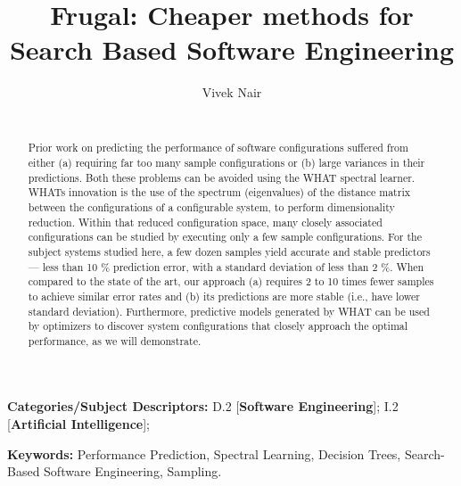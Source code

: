 \documentclass{newsig}
\begin{document}
\title{Frugal: Cheaper methods for Search Based Software Engineering} 
\author{
        \alignauthor Vivek Nair \\
        \\
               }
\maketitle 
\thispagestyle{plain}
\pagestyle{plain}
\begin{abstract}
Prior work on predicting the performance of software configurations
suffered from either (a) requiring far too many sample configurations or (b)
large variances in their predictions. Both these problems can be avoided
using the WHAT spectral learner. WHAT\textquotesingle s innovation is the use of the spectrum
(eigenvalues) of the distance matrix between the configurations of a configurable
system, to perform dimensionality reduction. Within that reduced configuration
space, many closely associated configurations can be studied by executing only
a few sample configurations. For the subject systems studied here, a few
dozen samples yield accurate and stable predictors --- less than 10 \% prediction
error, with a standard deviation of less than 2 \%. When compared to the state of
the art, our approach (a) requires 2 to 10 times fewer samples to achieve similar
error rates and (b) its predictions are more stable (i.e., have lower standard
deviation). Furthermore, predictive models generated by WHAT can be used
by optimizers to discover system configurations that closely approach the
optimal performance, as we will demonstrate.
\end{abstract}

\vspace{1ex}
\noindent
{\bf Categories/Subject Descriptors:} 
D.2 [{\bf Software Engineering}];
I.2 [{\bf Artificial Intelligence}];

 
\vspace{1ex}
\noindent
{\bf Keywords:} Performance Prediction, 
Spectral Learning, 
Decision Trees,
Search-Based Software Engineering, 
Sampling.
 

 
\end{document}

